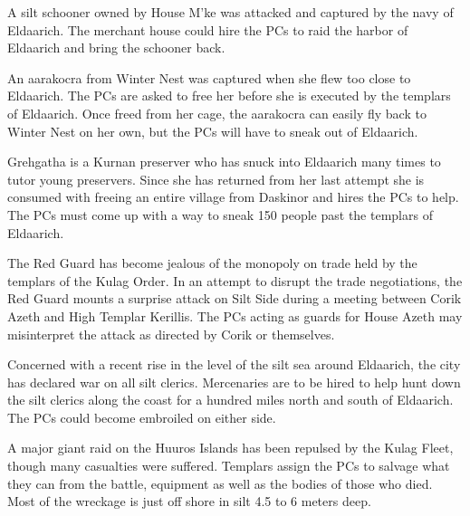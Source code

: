 {
	\item A silt schooner owned by House M'ke was attacked and captured by the navy of Eldaarich. The merchant house could hire the PCs to raid the harbor of Eldaarich and bring the schooner back.
	\item An aarakocra from Winter Nest was captured when she flew too close to Eldaarich. The PCs are asked to free her before she is executed by the templars of Eldaarich. Once freed from her cage, the aarakocra can easily fly back to Winter Nest on her own, but the PCs will have to sneak out of Eldaarich.
	\item Grehgatha is a Kurnan preserver who has snuck into Eldaarich many times to tutor young preservers. Since she has returned from her last attempt she is consumed with freeing an entire village from Daskinor and hires the PCs to help. The PCs must come up with a way to sneak 150 people past the templars of Eldaarich.
	\item The Red Guard has become jealous of the monopoly on trade held by the templars of the Kulag Order. In an attempt to disrupt the trade negotiations, the Red Guard mounts a surprise attack on Silt Side during a meeting between Corik Azeth and High Templar Kerillis. The PCs acting as guards for House Azeth may misinterpret the attack as directed by Corik or themselves.
	\item Concerned with a recent rise in the level of the silt sea around Eldaarich, the city has declared war on all silt clerics. Mercenaries are to be hired to help hunt down the silt clerics along the coast for a hundred miles north and south of Eldaarich. The PCs could become embroiled on either side.
	\item A major giant raid on the Huuros Islands has been repulsed by the Kulag Fleet, though many casualties were suffered. Templars assign the PCs to salvage what they can from the battle, equipment as well as the bodies of those who died. Most of the wreckage is just off shore in silt 4.5 to 6 meters deep.
}